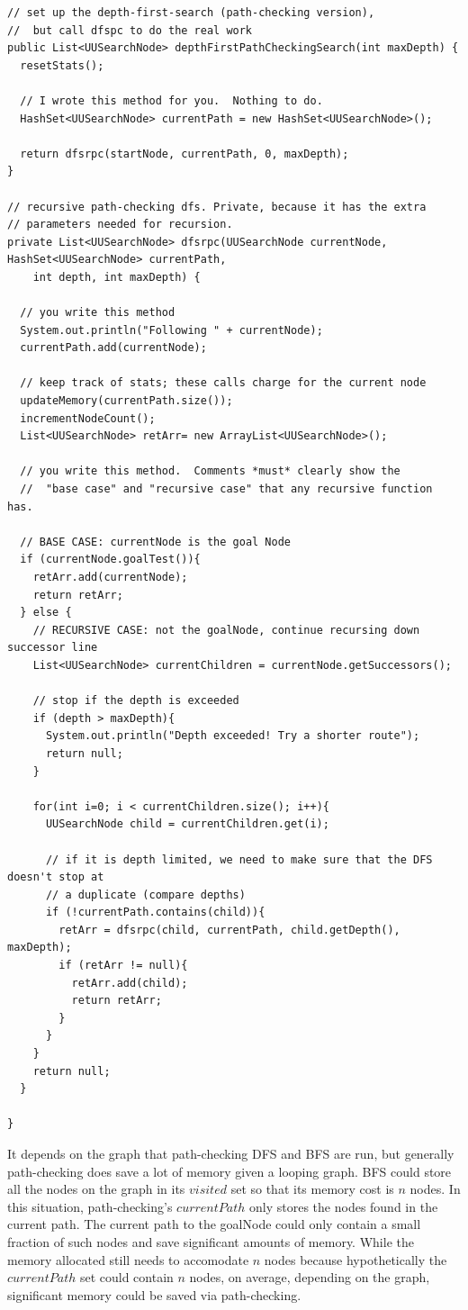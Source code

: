 \documentclass[a4paper]{report}
\begin{document}
\begin{lstlisting}
// set up the depth-first-search (path-checking version), 
//  but call dfspc to do the real work
public List<UUSearchNode> depthFirstPathCheckingSearch(int maxDepth) {
  resetStats();
  
  // I wrote this method for you.  Nothing to do.
  HashSet<UUSearchNode> currentPath = new HashSet<UUSearchNode>();

  return dfsrpc(startNode, currentPath, 0, maxDepth);
}

// recursive path-checking dfs. Private, because it has the extra
// parameters needed for recursion.
private List<UUSearchNode> dfsrpc(UUSearchNode currentNode, HashSet<UUSearchNode> currentPath,
    int depth, int maxDepth) {

  // you write this method
  System.out.println("Following " + currentNode);
  currentPath.add(currentNode);
  
  // keep track of stats; these calls charge for the current node
  updateMemory(currentPath.size());
  incrementNodeCount();
  List<UUSearchNode> retArr= new ArrayList<UUSearchNode>();

  // you write this method.  Comments *must* clearly show the 
  //  "base case" and "recursive case" that any recursive function has.	
  
  // BASE CASE: currentNode is the goal Node
  if (currentNode.goalTest()){
    retArr.add(currentNode);
    return retArr;
  } else {
    // RECURSIVE CASE: not the goalNode, continue recursing down successor line
    List<UUSearchNode> currentChildren = currentNode.getSuccessors();
    
    // stop if the depth is exceeded
    if (depth > maxDepth){
      System.out.println("Depth exceeded! Try a shorter route");
      return null;
    }
    
    for(int i=0; i < currentChildren.size(); i++){
      UUSearchNode child = currentChildren.get(i);
      
      // if it is depth limited, we need to make sure that the DFS doesn't stop at 
      // a duplicate (compare depths)
      if (!currentPath.contains(child)){
        retArr = dfsrpc(child, currentPath, child.getDepth(), maxDepth);
        if (retArr != null){
          retArr.add(child);
          return retArr;
        }
      } 
    }
    return null;
  }

}
\end{lstlisting}

It depends on the graph that path-checking DFS and BFS are run, but generally path-checking does save
a lot of memory given a looping graph. 
BFS could store all the nodes on the graph in its $visited$ set so that its memory cost is
$n$ nodes. In this situation, path-checking's $currentPath$ only stores the nodes found in the current path. 
The current path to the goalNode could only contain a small fraction of such nodes and save significant amounts
of memory. While the memory allocated still needs to accomodate $n$ nodes because hypothetically the $currentPath$ set
could contain $n$ nodes, on average, depending on the graph, significant memory could be saved via path-checking. 
\end{document}
